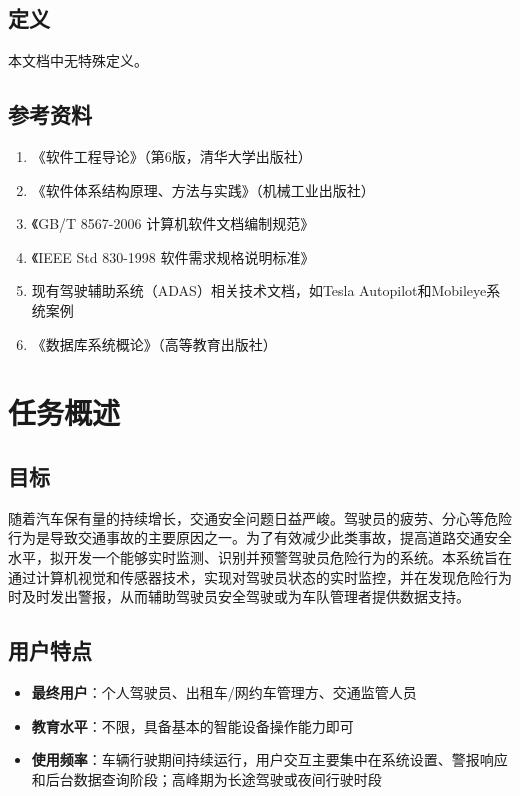 \documentclass[a4paper,12pt]{article}
\begin{document}
\subsection{定义}
本文档中无特殊定义。

\subsection{参考资料}
\begin{enumerate}
    \item 《软件工程导论》（第6版，清华大学出版社）
    \item 《软件体系结构原理、方法与实践》（机械工业出版社）
    \item 《GB/T 8567-2006 计算机软件文档编制规范》
    \item 《IEEE Std 830-1998 软件需求规格说明标准》
    \item 现有驾驶辅助系统（ADAS）相关技术文档，如Tesla Autopilot和Mobileye系统案例
    \item 《数据库系统概论》（高等教育出版社）
\end{enumerate}

\section{任务概述}

\subsection{目标}
随着汽车保有量的持续增长，交通安全问题日益严峻。驾驶员的疲劳、分心等危险行为是导致交通事故的主要原因之一。为了有效减少此类事故，提高道路交通安全水平，拟开发一个能够实时监测、识别并预警驾驶员危险行为的系统。本系统旨在通过计算机视觉和传感器技术，实现对驾驶员状态的实时监控，并在发现危险行为时及时发出警报，从而辅助驾驶员安全驾驶或为车队管理者提供数据支持。

\subsection{用户特点}
\begin{itemize}
    \item \textbf{最终用户}：个人驾驶员、出租车/网约车管理方、交通监管人员
    \item \textbf{教育水平}：不限，具备基本的智能设备操作能力即可
    \item \textbf{使用频率}：车辆行驶期间持续运行，用户交互主要集中在系统设置、警报响应和后台数据查询阶段；高峰期为长途驾驶或夜间行驶时段
\end{itemize}
\end{document}
